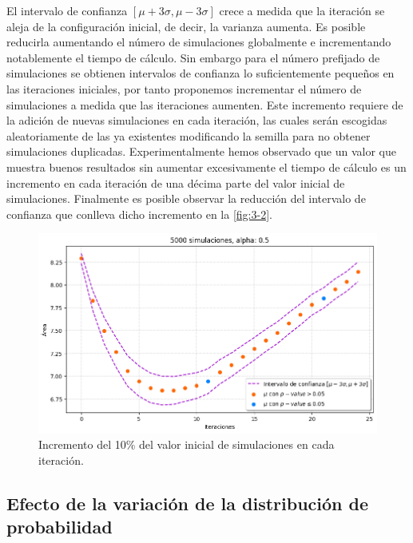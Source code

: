 \documentclass[../proyecto.tex]{memoir}
\begin{document}
El intervalo de confianza $[\mu+3\sigma, \mu-3\sigma]$ crece a medida que la iteración se aleja de la configuración inicial, de decir, la varianza aumenta. Es posible reducirla aumentando el número de simulaciones globalmente e incrementando notablemente el tiempo de cálculo. Sin embargo para el número prefijado de simulaciones se obtienen intervalos de confianza lo suficientemente pequeños en las iteraciones iniciales, por tanto proponemos incrementar el número de simulaciones a medida que las iteraciones aumenten. Este incremento requiere de la adición de nuevas simulaciones en cada iteración, las cuales serán escogidas aleatoriamente de las ya existentes modificando la semilla para no obtener simulaciones duplicadas. Experimentalmente hemos observado que un valor que muestra buenos resultados sin aumentar excesivamente el tiempo de cálculo es un incremento en cada iteración de una décima parte del valor inicial de simulaciones. Finalmente es posible observar la reducción del intervalo de confianza que conlleva dicho incremento en la \autoref{fig:3-2}.

\begin{figure}[H]
        \centering
        \includegraphics[width=\textwidth]{./images/iteracion_inc.png}
        \caption{Incremento del 10\% del valor inicial de simulaciones en cada iteración.}
        \label{fig:3-2}
\end{figure} 

\subsection{Efecto de la variación de la distribución de probabilidad}
\end{document}
